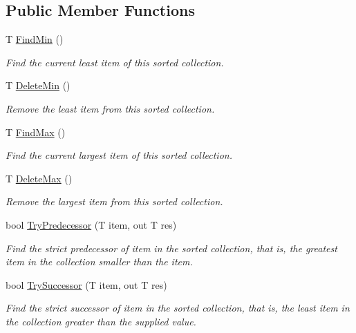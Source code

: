 \subsection*{Public Member Functions}
\begin{DoxyCompactItemize}
\item 
T \hyperlink{interface_c5_1_1_i_sorted_ad7a7fc9df9ff4fd5e5ab399c5703f995}{Find\+Min} ()
\begin{DoxyCompactList}\small\item\em Find the current least item of this sorted collection. \end{DoxyCompactList}\item 
T \hyperlink{interface_c5_1_1_i_sorted_ad30bc55d0c81e695896d459422b76954}{Delete\+Min} ()
\begin{DoxyCompactList}\small\item\em Remove the least item from this sorted collection. \end{DoxyCompactList}\item 
T \hyperlink{interface_c5_1_1_i_sorted_a9321a921a443cfd8411534fbef19ab00}{Find\+Max} ()
\begin{DoxyCompactList}\small\item\em Find the current largest item of this sorted collection. \end{DoxyCompactList}\item 
T \hyperlink{interface_c5_1_1_i_sorted_a58b26b758745ad2146252b9e5ff2965b}{Delete\+Max} ()
\begin{DoxyCompactList}\small\item\em Remove the largest item from this sorted collection. \end{DoxyCompactList}\item 
bool \hyperlink{interface_c5_1_1_i_sorted_ad8189cb7e5d50d33a24a75641eaeab34}{Try\+Predecessor} (T item, out T res)
\begin{DoxyCompactList}\small\item\em Find the strict predecessor of item in the sorted collection, that is, the greatest item in the collection smaller than the item. \end{DoxyCompactList}\item 
bool \hyperlink{interface_c5_1_1_i_sorted_a578a0b4db8e2b04543c72d1bf645ce65}{Try\+Successor} (T item, out T res)
\begin{DoxyCompactList}\small\item\em Find the strict successor of item in the sorted collection, that is, the least item in the collection greater than the supplied value. \end{DoxyCompactList}\item 

\end{DoxyCompactItemize}
